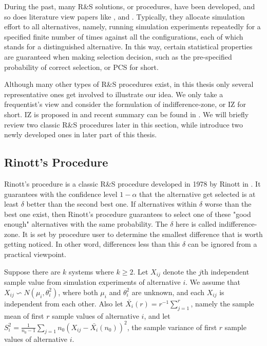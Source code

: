 \documentclass[12pt,a4paper]{report}
\begin{document}
During the past, many R\&S solutions, or procedures, have been developed, and so does literature view papers like \cite{ras-recent-advances}, \cite{ehiorams06ras} and \cite{ms05ras}. Typically, they allocate simulation effort to all alternatives, namely, running simulation experiments repeatedly for a specified finite number of times against all the configurations, each of which stands for a distinguished alternative. In this way, certain statistical properties are guaranteed when making selection decision, such as the pre-specified probability of correct selection, or PCS for short.

Although many other types of R\&S procedures exist, in this thesis only several representative ones get involved to illustrate our idea. We only take a frequentist’s view and consider the formulation of indifference-zone, or IZ for short. IZ is proposed in \cite{toams1954iz} and recent summary can be found in \cite{nyjws95iz}. We will briefly review two classic R\&S procedures later in this section, while introduce two newly developed ones in later part of this thesis.

\subsection{Rinott's Procedure}

Rinott's procedure is a classic R\&S procedure developed in 1978 by Rinott in \cite{cistam1978rinott}. It guarantees with the confidence level $1 - \alpha$ that the alternative get selected is at least $\delta$ better than the second best one. If alternatives within $\delta$ worse than the best one exist, then Rinott's procedure guarantees to select one of these "good enough" alternatives with the same probability. The $\delta$ here is called indifference-zone. It is set by procedure user to determine the smallest difference that is worth getting noticed. In other word, differences less than this $\delta$ can be ignored from a practical viewpoint.

Suppose there are $k$ systems where $k \geqslant 2$. Let $X_{ij}$ denote the $j$th independent sample value from simulation experiments of alternative $i$. We assume that $X_{ij} \backsim N(\mu_i, \theta_i^2)$, where both $\mu_i$ and $\theta_i^2$ are unknown, and each $X_{ij}$ is independent from each other. Also let $\bar{X_i}(r) = r^{-1}\sum_{j=1}^r$, namely the sample mean of first $r$ sample values of alternative $i$, and let $S_i^2 = \frac{1}{n_0 - 1}\sum_{j=1}{n_0}(X_{ij} - \bar{X_i}(n_0))^2$, the sample variance of first $r$ sample values of alternative $i$.
\end{document}
